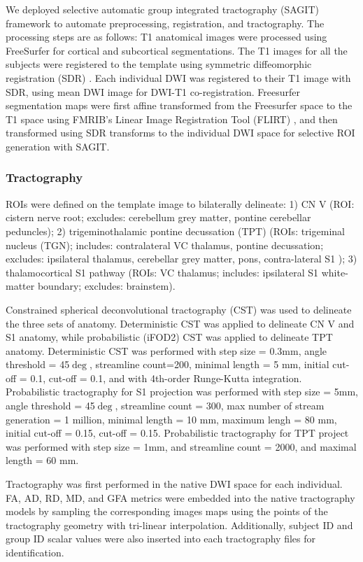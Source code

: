 We deployed selective automatic group integrated tractography (SAGIT) framework to automate preprocessing, registration, and tractography. The processing steps are as follows: T1 anatomical images were processed using FreeSurfer \cite{Fischl2004} for cortical and subcortical segmentations. The T1 images for all the subjects were registered to the template using symmetric diffeomorphic registration (SDR) \cite{Avants2008b}. Each individual DWI was registered to their T1 image with SDR, using mean DWI image for DWI-T1 co-registration. Freesurfer segmentation maps were first affine transformed from the Freesurfer space to the T1 space using FMRIB's Linear Image Registration Tool (FLIRT) \cite{Jenkinson2001,Jenkinson2002}, and then transformed using SDR transforms to the individual DWI space for selective ROI generation with SAGIT.

\subsubsection{Tractography}
ROIs were defined on the template image to bilaterally delineate: 1) CN V (ROI: cistern nerve root; excludes: cerebellum grey matter, pontine cerebellar peduncles); 2) trigeminothalamic pontine decussation (TPT) (ROIs: trigeminal nucleus (TGN); includes: contralateral VC thalamus, pontine decussation; excludes: ipsilateral thalamus, cerebellar grey matter, pons, contra-lateral S1 ); 3) thalamocortical S1 pathway (ROIs: VC thalamus; includes: ipsilateral S1 white-matter boundary; excludes: brainstem).  

Constrained spherical deconvolutional tractography (CST) \cite{Tournier2012b} was used to delineate the three sets of anatomy. Deterministic CST was applied to delineate CN V and S1 anatomy, while probabilistic (iFOD2) CST \cite{Jeurissen2011b,Tournier2010} was applied to delineate TPT anatomy. Deterministic CST was performed with step size = 0.3mm, angle threshold = 45$\deg$, streamline count=200, minimal length = 5 mm, initial cut-off = 0.1, cut-off = 0.1, and with 4th-order Runge-Kutta integration. Probabilistic tractography for S1 projection was performed with step size = 5mm, angle threshold = 45$\deg$, streamline count = 300, max number of stream generation = 1 million, minimal length = 10 mm, maximum lengh = 80 mm, initial cut-off = 0.15, cut-off = 0.15. Probabilistic tractography for TPT project was performed with step size = 1mm, and streamline count = 2000, and maximal length = 60 mm. 

Tractography was first performed in the native DWI space for each individual.  FA, AD, RD, MD, and GFA metrics were embedded into the native tractography models by sampling the corresponding images maps using the points of the tractography geometry with tri-linear interpolation. Additionally, subject ID and group ID scalar values were also inserted into each tractography files for identification. 

